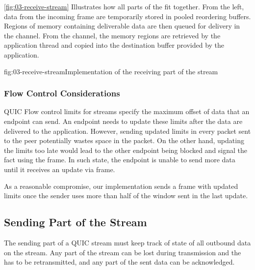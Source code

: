 

\autoref{fig:03-receive-stream} Illustrates how all parts of the \ReceiveStream{} fit together.
From the left, data from the incoming \STREAM{} frame are temporarily stored in pooled reordering
buffers. Regions of memory containing deliverable data are then queued for delivery in the channel.
From the channel, the memory regions are retrieved by the application thread and copied into the
destination buffer provided by the application.

\begin{myFigure}{fig:03-receive-stream}{Implementation of the receiving part of the stream}

  \resizebox{\linewidth}{!}{}

\end{myFigure}

\subsubsection{Flow Control Considerations}

QUIC Flow control limits for streams specify the maximum offset of data that an endpoint can send.
An endpoint needs to update these limits after the data are delivered to the application. However,
sending updated limits in every packet sent to the peer potentially wastes space in the packet. On
the other hand, updating the limits too late would lead to the other endpoint being blocked and
signal the fact using the \STREAMDATABLOCKED{} frame. In such state, the endpoint is unable to send
more data until it receives an update via \MAXSTREAMDATA{} frame.

As a reasonable compromise, our implementation sends a \MAXSTREAMDATA{} frame with updated limits
once the sender uses more than half of the window sent in the last update.

\subsection{Sending Part of the Stream}

The sending part of a QUIC stream must keep track of state of all outbound data on the stream. Any
part of the stream can be lost during transmission and the has to be retransmitted, and any part of
the sent data can be acknowledged.

